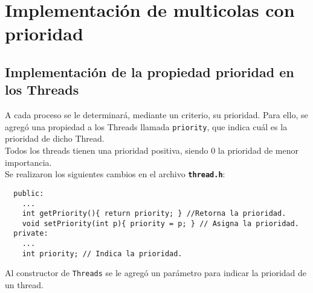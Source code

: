 \section{Implementación de multicolas con prioridad}
\subsection*{Implementación de la propiedad prioridad en los Threads}
A cada proceso se le determinará, mediante un criterio, su prioridad. Para ello, se agregó una propiedad a los Threads llamada \texttt{priority}, que indica cuál es la prioridad de dicho Thread.\\
Todos los threads tienen una prioridad positiva, siendo 0 la prioridad de menor importancia.\\
Se realizaron los siguientes cambios en el archivo \textbf{\texttt{thread.h}}:
\begin{lstlisting}
  public:
    ...
    int getPriority(){ return priority; } //Retorna la prioridad.
    void setPriority(int p){ priority = p; } // Asigna la prioridad.
  private:
    ...
    int priority; // Indica la prioridad.
\end{lstlisting}
Al constructor de \texttt{Threads} se le agregó un parámetro para indicar la prioridad de un thread.
